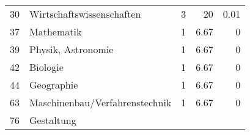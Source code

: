 \begin{longtable}{lXrrr}
     30 &
     \multicolumn{1}{X}{ Wirtschaftswissenschaften   } &


       \num{3} &
       \num[round-mode=places,round-precision=2]{20} &
         \num[round-mode=places,round-precision=2]{0.01} \\

     37 &
     \multicolumn{1}{X}{ Mathematik   } &


       \num{1} &
       \num[round-mode=places,round-precision=2]{6.67} &
         \num[round-mode=places,round-precision=2]{0} \\

     39 &
     \multicolumn{1}{X}{ Physik, Astronomie   } &


       \num{1} &
       \num[round-mode=places,round-precision=2]{6.67} &
         \num[round-mode=places,round-precision=2]{0} \\

     42 &
     \multicolumn{1}{X}{ Biologie   } &


       \num{1} &
       \num[round-mode=places,round-precision=2]{6.67} &
         \num[round-mode=places,round-precision=2]{0} \\

     44 &
     \multicolumn{1}{X}{ Geographie   } &


       \num{1} &
       \num[round-mode=places,round-precision=2]{6.67} &
         \num[round-mode=places,round-precision=2]{0} \\

     63 &
     \multicolumn{1}{X}{ Maschinenbau/Verfahrenstechnik   } &


       \num{1} &
       \num[round-mode=places,round-precision=2]{6.67} &
         \num[round-mode=places,round-precision=2]{0} \\

     76 &
     \multicolumn{1}{X}{ Gestaltung   } &



\end{longtable}
